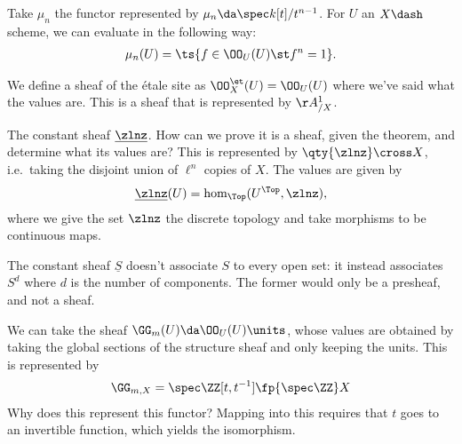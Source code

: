 \begin{example}

Take \(\mu_n\) the functor represented by
\(\mu_n \da \spec k[t] / t^{n-1}\). For \(U\) an \(X\dash\)scheme, we
can evaluate in the following way:
\begin{align*}  
\mu_n(U) = \ts{f\in \OO_U(U) \st f^n = 1}
.\end{align*}

\end{example}

\begin{example}[?]

We define a sheaf of the étale site as \(\OO^{\et}_X(U) = \OO_U(U)\)
where we've said what the values are. This is a sheaf that is
represented by \(\AA^1_{/X}\).

\end{example}

\begin{example}[?]

The constant sheaf \(\underline{\zlnz}\). How can we prove it is a
sheaf, given the theorem, and determine what its values are? This is
represented by \(\qty{\zlnz} \cross X\), i.e.~taking the disjoint union
of \(\ell^n\) copies of \(X\). The values are given by
\begin{align*}  
\underline{\zlnz}(U) =  \hom_{\Top}(U^{\Top}, \zlnz)
,\end{align*} where we give the set \(\zlnz\) the discrete topology and
take morphisms to be continuous maps.

\end{example}

\begin{warnings}

The constant sheaf \(\underline{S}\) doesn't associate \(S\) to every
open set: it instead associates \(S^d\) where \(d\) is the number of
components. The former would only be a presheaf, and not a sheaf.

\end{warnings}

\begin{example}[?]

We can take the sheaf \(\GG_m(U) \da \OO_U(U)\units\), whose values are
obtained by taking the global sections of the structure sheaf and only
keeping the units. This is represented by
\begin{align*}
\GG_{m, X} = \spec \ZZ[t, t^{-1}] \fp{\spec \ZZ} X
\end{align*} Why does this represent this functor? Mapping into this
requires that \(t\) goes to an invertible function, which yields the
isomorphism.

\end{example}

